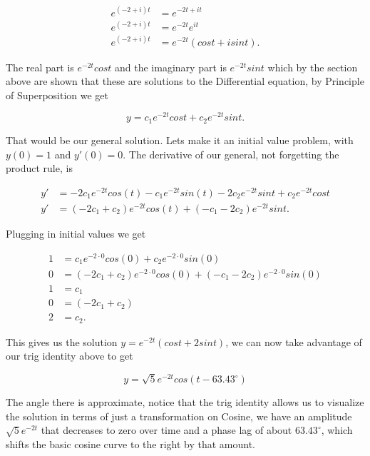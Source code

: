 \documentclass[12pt]{article}
\begin{document}
\begin{align*}
    e^{(-2+i)t} &= e^{-2t+it} \\
    e^{(-2+i)t} &= e^{-2t}e^{it} \\
    e^{(-2+i)t} &= e^{-2t}(cost+isint).
\end{align*}

The real part is $e^{-2t}cost$ and the imaginary part is $e^{-2t}sint$ which by the section above are shown that these are solutions to the Differential equation, by Principle of Superposition we get

\begin{equation*}
    y=c_1e^{-2t}cost+c_2e^{-2t}sint.
\end{equation*}

That would be our general solution. Lets make it an initial value problem, with $y(0)=1$ and $y'(0)=0$. The derivative of our general, not forgetting the product rule, is

\begin{align*}
    y' &= -2c_1e^{-2t}cos(t)-c_1e^{-2t}sin(t)-2c_2e^{-2t}sint+c_2e^{-2t}cost \\
    y' &= (-2c_1+c_2)e^{-2t}cos(t)+(-c_1-2c_2)e^{-2t}sint.
\end{align*}

Plugging in initial values we get

\begin{align*}
    1  &= c_1e^{-2\cdot0}cos(0)+c_2e^{-2 \cdot 0}sin(0) \\
    0 &= (-2c_1+c_2)e^{-2 \cdot 0}cos(0)+(-c_1-2c_2)e^{-2 \cdot 0}sin(0) \\
    1 &= c_1 \\
    0 &= (-2c_1+c_2) \\
    2 &=c_2.
\end{align*}

This gives us the solution $y=e^{-2t}(cost+2sint)$, we can now take advantage of our trig identity above to get

\begin{equation*}
    y = \sqrt{5}e^{-2t}cos(t-63.43^{\circ})
\end{equation*}

The angle there is approximate, notice that the trig identity allows us to visualize the solution in terms of just a transformation on Cosine, we have an amplitude $\sqrt{5}e^{-2t}$ that decreases to zero over time and a phase lag of about $63.43^{\circ}$, which shifts the basic cosine curve to the right by that amount. \\
\end{document}
